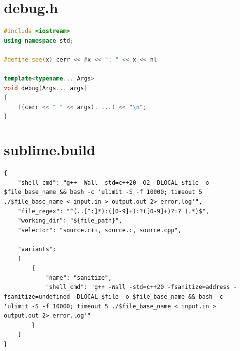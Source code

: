 \section{debug.h}
\begin{lstlisting}[language=C++]
#include <iostream>
using namespace std;

#define see(x) cerr << #x << ": " << x << nl

template<typename... Args>
void debug(Args... args)
{
    ((cerr << " " << args), ...) << "\n";
}
\end{lstlisting}
\sectionend

\section{sublime.build}
\begin{lstlisting}
{
    "shell_cmd": "g++ -Wall -std=c++20 -O2 -DLOCAL $file -o $file_base_name && bash -c 'ulimit -S -f 10000; timeout 5 ./$file_base_name < input.in > output.out 2> error.log'",
    "file_regex": "^(..[^:]*):([0-9]+):?([0-9]+)?:? (.*)$",
    "working_dir": "${file_path}",
    "selector": "source.c++, source.c, source.cpp",

    "variants":
    [
        {
            "name": "sanitize",
            "shell_cmd": "g++ -Wall -std=c++20 -fsanitize=address -fsanitize=undefined -DLOCAL $file -o $file_base_name && bash -c 'ulimit -S -f 10000; timeout 5 ./$file_base_name < input.in > output.out 2> error.log'"
        }
    ]
}

\end{lstlisting}
\sectionend

